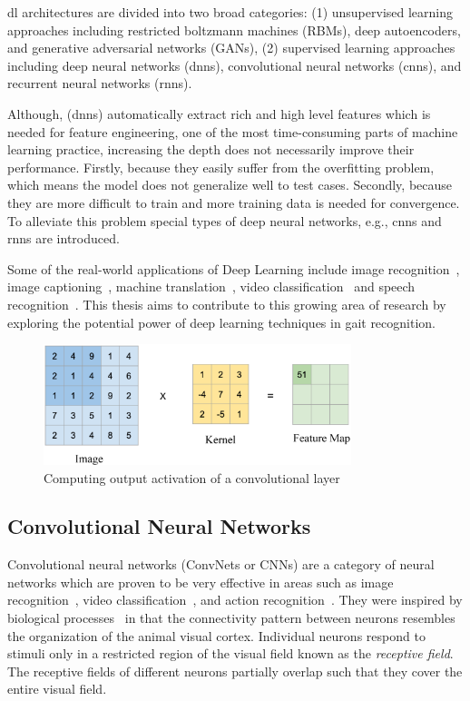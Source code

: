\gls{dl} architectures are divided into two broad categories: (1) unsupervised learning approaches including restricted boltzmann machines (RBMs), deep autoencoders, and generative adversarial networks (GANs), (2) supervised learning approaches including deep neural networks (\gls{dnn}s), convolutional neural networks (\gls{cnn}s), and recurrent neural networks (\gls{rnn}s).


Although, (\gls{dnn}s) automatically extract rich and high level features which is needed for feature engineering, one of the most time-consuming parts of machine learning practice, increasing the depth does not necessarily improve their performance. Firstly, because they easily suffer from the overfitting problem, which means the model does not generalize well to test cases. Secondly, because they are more difficult to train and more training data is needed for convergence. To alleviate this problem special types of deep neural networks, e.g., \gls{cnn}s and \gls{rnn}s are introduced.


Some of the real-world applications of Deep Learning include image recognition~\cite{Krizhevsky_12}, image captioning~\cite{Mao_15}, machine translation~\cite{kal_13}, video classification~\cite{karpathy_14} and speech recognition~\cite{graves_13}. This thesis aims to contribute to this growing area of research by exploring the potential power of deep learning techniques in gait recognition. 


\begin{figure}
	\centering
	\includegraphics[width=0.8\textwidth]{figures/convolution.eps}
	\caption[Computing output activation of a convolutional layer]
	{Computing output activation of a convolutional layer \label{fig:convolution}}
\end{figure}


\subsection{Convolutional Neural Networks}
Convolutional neural networks (ConvNets or CNNs) are a category of neural networks which are proven to be very effective in areas such as image recognition~\cite{Krizhevsky_12}, video classification~\cite{karpathy_14}, and action recognition~\cite{Tran_15}. They were inspired by biological processes~\cite{Hubel_68} in that the connectivity pattern between neurons resembles the organization of the animal visual cortex. Individual neurons respond to stimuli only in a restricted region of the visual field known as the \textit{receptive field}. The receptive fields of different neurons partially overlap such that they cover the entire visual field. 


